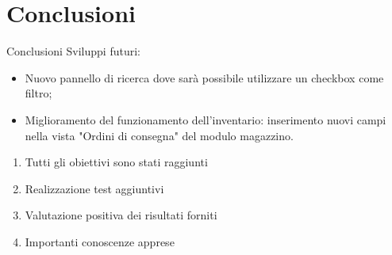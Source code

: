 \documentclass{beamer}
\begin{document}
\section{Conclusioni}
\begin{frame}{Conclusioni}
Sviluppi futuri:
\begin{itemize}

\item Nuovo pannello di ricerca dove sarà possibile utilizzare un checkbox come filtro;
\item Miglioramento del funzionamento dell'inventario: inserimento nuovi campi nella vista "Ordini di consegna" del modulo magazzino.
\end{itemize}
	\vspace{0.5cm}
	\begin{enumerate}
		\item Tutti gli obiettivi sono stati raggiunti
		\item Realizzazione test aggiuntivi
		\item Valutazione positiva dei risultati forniti
		\item Importanti conoscenze apprese
	\end{enumerate}
				

	
\end{frame}

%
\end{document}
